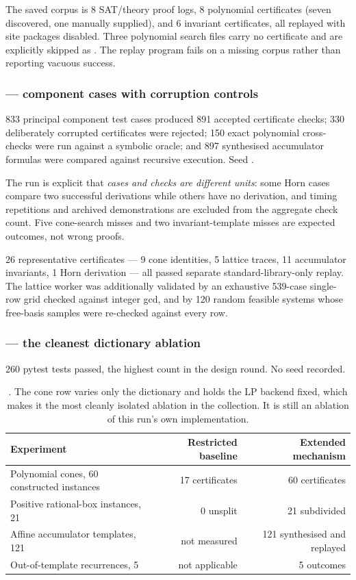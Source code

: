 The saved corpus is 8 SAT/theory proof logs, 8 polynomial certificates (seven
discovered, one manually supplied), and 6 invariant certificates, all replayed
with site packages disabled. Three polynomial search files carry no certificate
and are explicitly skipped as \unknown{}. The replay program fails on a missing
corpus rather than reporting vacuous success.

\subsubsection*{ --- component cases with corruption controls}

833 principal component test cases produced 891 accepted certificate checks;
330 deliberately corrupted certificates were rejected; 150 exact polynomial
cross-checks were run against a symbolic oracle; and 897 synthesised accumulator
formulas were compared against recursive execution. Seed .

The run is explicit that \emph{cases and checks are different units}: some Horn
cases compare two successful derivations while others have no derivation, and
timing repetitions and archived demonstrations are excluded from the aggregate
check count. Five cone-search misses and two invariant-template misses are
expected outcomes, not wrong proofs.

26 representative certificates --- 9 cone identities, 5 lattice traces, 11
accumulator invariants, 1 Horn derivation --- all passed separate
standard-library-only replay. The lattice worker was additionally validated by
an exhaustive 539-case single-row grid checked against integer gcd, and by 120
random feasible systems whose free-basis samples were re-checked against every
row.

\subsubsection*{ --- the cleanest dictionary ablation}

260 pytest tests passed, the highest count in the design round. No seed
recorded.

\begin{table}[htbp]
\centering\small
\begin{tabular}{@{}lrr@{}}
\toprule
Experiment & Restricted baseline & Extended mechanism \\
\midrule
Polynomial cones, 60 constructed instances & 17 certificates & 60 certificates \\
Positive rational-box instances, 21 & 0 unsplit & 21 subdivided \\
Affine accumulator templates, 121 & not measured & 121 synthesised and replayed \\
Out-of-template recurrences, 5 & not applicable & 5 \unknown{} outcomes \\
\bottomrule
\end{tabular}
\caption{. The cone row varies only the dictionary and holds the LP
backend fixed, which makes it the most cleanly isolated ablation in the
collection. It is still an ablation of this run's own implementation.}
\label{tab:p8}
\end{table}

